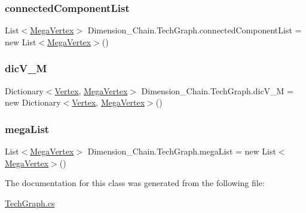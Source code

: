 \mbox{\label{class_dimension___chain_1_1_tech_graph_a6a1f06b67ab3ec7ced24c72f67ca93fe}} 
\subsubsection{\texorpdfstring{connected\+Component\+List}{connectedComponentList}}
{\footnotesize\ttfamily List$<$\mbox{\hyperlink{class_dimension___chain_1_1_mega_vertex}{Mega\+Vertex}}$>$ Dimension\+\_\+\+Chain.\+Tech\+Graph.\+connected\+Component\+List = new List$<$\mbox{\hyperlink{class_dimension___chain_1_1_mega_vertex}{Mega\+Vertex}}$>$()}

\mbox{\label{class_dimension___chain_1_1_tech_graph_a80c1cd831ba29a79fd9cedd2ef96e0d6}} 
\subsubsection{\texorpdfstring{dic\+V\+\_\+M}{dicV\_M}}
{\footnotesize\ttfamily Dictionary$<$\mbox{\hyperlink{class_dimension___chain_1_1_vertex}{Vertex}}, \mbox{\hyperlink{class_dimension___chain_1_1_mega_vertex}{Mega\+Vertex}}$>$ Dimension\+\_\+\+Chain.\+Tech\+Graph.\+dic\+V\+\_\+M = new Dictionary$<$\mbox{\hyperlink{class_dimension___chain_1_1_vertex}{Vertex}}, \mbox{\hyperlink{class_dimension___chain_1_1_mega_vertex}{Mega\+Vertex}}$>$()}

\mbox{\label{class_dimension___chain_1_1_tech_graph_a8ae5de1b7b7cc6438d8dc879cc7baa5d}} 
\subsubsection{\texorpdfstring{mega\+List}{megaList}}
{\footnotesize\ttfamily List$<$\mbox{\hyperlink{class_dimension___chain_1_1_mega_vertex}{Mega\+Vertex}}$>$ Dimension\+\_\+\+Chain.\+Tech\+Graph.\+mega\+List = new List$<$\mbox{\hyperlink{class_dimension___chain_1_1_mega_vertex}{Mega\+Vertex}}$>$()}



The documentation for this class was generated from the following file\+:\begin{DoxyCompactItemize}
\item 
\mbox{\hyperlink{_tech_graph_8cs}{Tech\+Graph.\+cs}}\end{DoxyCompactItemize}
